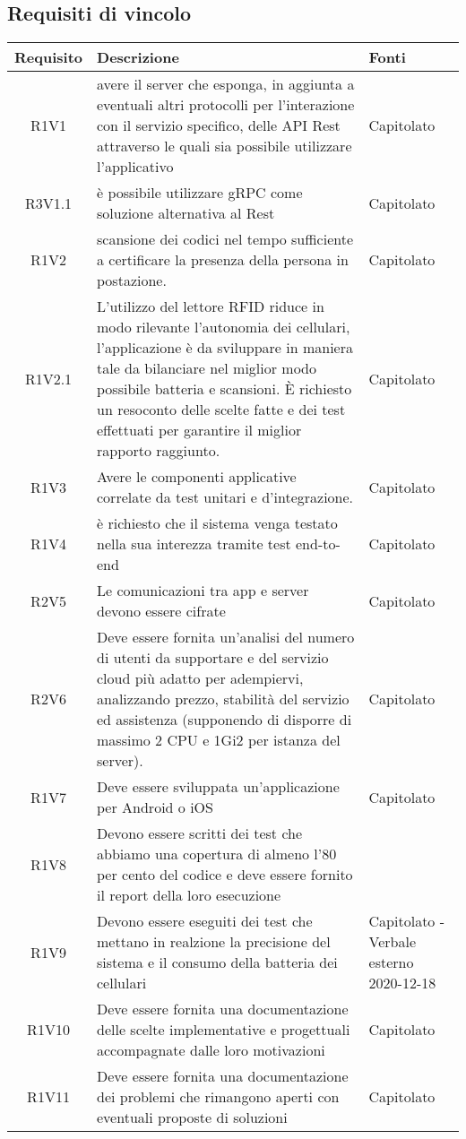 \subsection{Requisiti di vincolo}
\begin{center}
	\begin{longtable}{|c|p{10cm}|p{4cm}|}
		\hline
		\rowcolor{lighter-grayer}
		\textbf{Requisito} & \textbf{Descrizione} & \textbf{Fonti}  \\
		\hline
		\endfirsthead
		
		 R1V1 &avere il server che esponga, in aggiunta a eventuali altri protocolli per l’interazione con il servizio specifico, delle API Rest attraverso le quali sia possibile utilizzare l'applicativo &Capitolato \\
		\hline
		R3V1.1&è possibile utilizzare gRPC come soluzione alternativa al Rest	& Capitolato	\\
		\hline
R1V2&scansione dei codici nel tempo sufficiente a certificare la presenza  della persona in postazione.	& Capitolato	\\
		\hline
R1V2.1&L’utilizzo del lettore RFID riduce in modo rilevante l’autonomia dei cellulari, l’applicazione è da sviluppare in maniera tale da bilanciare nel miglior modo possibile batteria e scansioni. È richiesto un resoconto delle scelte fatte e dei test effettuati per garantire il miglior rapporto raggiunto.	& Capitolato	\\
		\hline
		R1V3&Avere le componenti applicative correlate da test unitari e d’integrazione.	& Capitolato	\\
		\hline
R1V4&è richiesto che il sistema venga testato nella sua interezza tramite test end-to-end	& Capitolato	\\
		\hline
R2V5&Le comunicazioni tra app e server devono essere cifrate	& Capitolato	\\
		\hline
		R2V6&	Deve essere fornita un'analisi del numero di utenti da supportare e del servizio cloud più adatto per adempiervi, analizzando prezzo, stabilità del servizio ed assistenza (supponendo di disporre di massimo 2 CPU e 1Gi2 per istanza del server).& Capitolato	\\
		\hline
R1V7&Deve essere sviluppata un'applicazione per Android o iOS	& Capitolato	\\
		\hline
R1V8&Devono essere scritti dei test che abbiamo una copertura di almeno l'80 per cento del codice e deve essere fornito il report della loro esecuzione	& 	\\
		\hline

R1V9&Devono essere eseguiti dei test che mettano in realzione la precisione del sistema e il consumo della batteria dei cellulari	& Capitolato - Verbale esterno 2020-12-18	\\
		\hline
R1V10&Deve essere fornita una documentazione delle scelte implementative e progettuali accompagnate dalle loro motivazioni	& Capitolato	\\
		\hline
	R1V11	&Deve essere fornita una documentazione dei problemi che rimangono aperti con eventuali proposte di soluzioni	& Capitolato	\\
		\hline
	\end{longtable}
\end{center}
